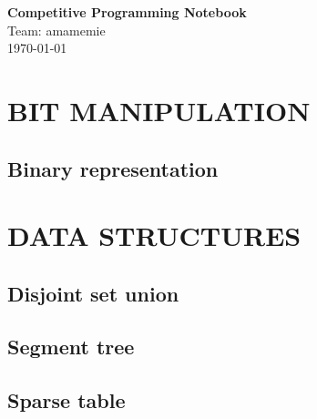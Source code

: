 \documentclass[10pt]{article}
\begin{document}
\begin{titlepage}
    \centering
    \vspace*{\fill}
    {\Huge\bfseries Competitive Programming Notebook}\\[1em]
    {\large Team: amamemie}\\[0.5em]
    {\normalsize \today}
    \vspace*{\fill}
\end{titlepage}

\newpage
\thispagestyle{empty}
\mbox{}

\newpage
{} %
\tableofcontents
\newpage


\section{BIT MANIPULATION}
\subsection{\texorpdfstring{Binary representation}{Binary representation}}


\section{DATA STRUCTURES}
\subsection{\texorpdfstring{Disjoint set union}{Disjoint set union}}

\subsection{\texorpdfstring{Segment tree}{Segment tree}}

\subsection{\texorpdfstring{Sparse table}{Sparse table}}

\end{document}
